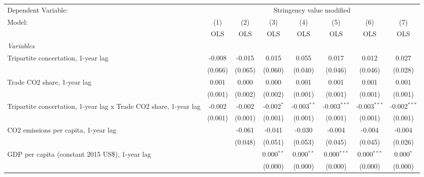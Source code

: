 
\begingroup
\centering
\begin{tabular}{lccccccc}
   \toprule
   Dependent Variable: & \multicolumn{7}{c}{Stringency value modified}\\
   Model:                                                            & (1)     & (2)     & (3)          & (4)           & (5)            & (6)            & (7)\\  
                                                                     &  OLS    & OLS     & OLS          & OLS           & OLS            & OLS            & OLS\\  
   \midrule
   \emph{Variables}\\
   Tripartite concertation, 1-year lag                               & -0.008  & -0.015  & 0.015        & 0.055         & 0.017          & 0.012          & 0.027\\   
                                                                     & (0.066) & (0.065) & (0.060)      & (0.040)       & (0.046)        & (0.046)        & (0.028)\\   
   Trade CO2 share, 1-year lag                                       & 0.001   & 0.000   & 0.000        & 0.001         & 0.001          & 0.001          & 0.001\\   
                                                                     & (0.001) & (0.002) & (0.002)      & (0.001)       & (0.001)        & (0.001)        & (0.001)\\   
   Tripartite concertation, 1-year lag x Trade CO2 share, 1-year lag & -0.002  & -0.002  & -0.002$^{*}$ & -0.003$^{**}$ & -0.003$^{***}$ & -0.003$^{***}$ & -0.002$^{***}$\\   
                                                                     & (0.001) & (0.001) & (0.001)      & (0.001)       & (0.001)        & (0.001)        & (0.001)\\   
   CO2 emissions per capita, 1-year lag                              &         & -0.061  & -0.041       & -0.030        & -0.004         & -0.004         & -0.004\\   
                                                                     &         & (0.048) & (0.051)      & (0.053)       & (0.045)        & (0.045)        & (0.026)\\   
   GDP per capita (constant 2015 US\$), 1-year lag                   &         &         & 0.000$^{**}$ & 0.000$^{**}$  & 0.000$^{***}$  & 0.000$^{***}$  & 0.000$^{*}$\\   
                                                                     &         &         & (0.000)      & (0.000)       & (0.000)        & (0.000)        & (0.000)\\   

\end{tabular}
